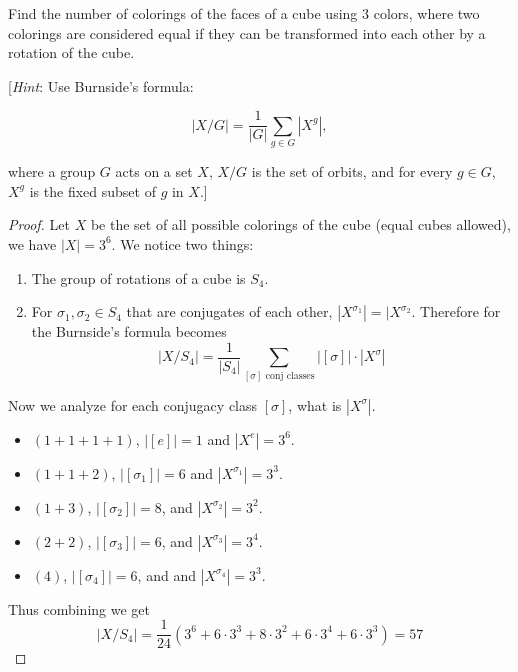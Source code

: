 \begin{prob}[S2014-Q1]
    Find the number of colorings of the faces of a cube using 3 colors, where two colorings are considered equal if they can be transformed into each other by a rotation of the cube.
    
    [\textit{Hint}: Use Burnside's formula:
    
    \[
    |X/G| = \frac{1}{|G|} \sum_{g \in G} |X^g|,
    \]
    
    where a group $G$ acts on a set $X$, $X/G$ is the set of orbits, and for every $g \in G$, $X^g$ is the fixed subset of $g$ in $X$.]
\end{prob}
\begin{proof}
    Let $X$ be the set of all possible colorings of the cube (equal cubes allowed), we have $|X|=3^6$. We notice two things:
    \begin{enumerate}
        \item The group of rotations of a cube is $S_4$.
        \item For $\sigma_1,\sigma_2\in S_4$ that are conjugates of each other, $|X^{\sigma_1}|=|X^{\sigma_2}$. Therefore for the Burnside's formula becomes 
        \begin{equation*}
            |X/S_4|=\frac{1}{|S_4|}\sum_{[\sigma]
            \text{ conj classes}}|[\sigma]|\cdot|X^\sigma|
        \end{equation*}
    \end{enumerate}
    Now we analyze for each conjugacy class $[\sigma]$, what is $|X^\sigma|$.
    \begin{itemize}
        \item $(1+1+1+1)$, $|[e]|=1$ and $|X^e|=3^6$.
        \item $(1+1+2)$, $|[\sigma_1]|=6$ and $|X^{\sigma_1}|=3^3$.
        \item $(1+3)$, $|[\sigma_2]|=8$, and $|X^{\sigma_2}|=3^2$.
        \item $(2+2)$, $|[\sigma_3]|=6$, and $|X^{\sigma_3}|=3^4$.
        \item $(4)$, $|[\sigma_4]|=6$, and and $|X^{\sigma_4}|=3^3$.
    \end{itemize}
    Thus combining we get 
    \begin{equation*}
        |X/S_4|=\frac{1}{24}\left(3^6+6\cdot 3^3+8\cdot 3^2+6\cdot 3^4+6\cdot 3^3\right)=57
    \end{equation*}
\end{proof}

